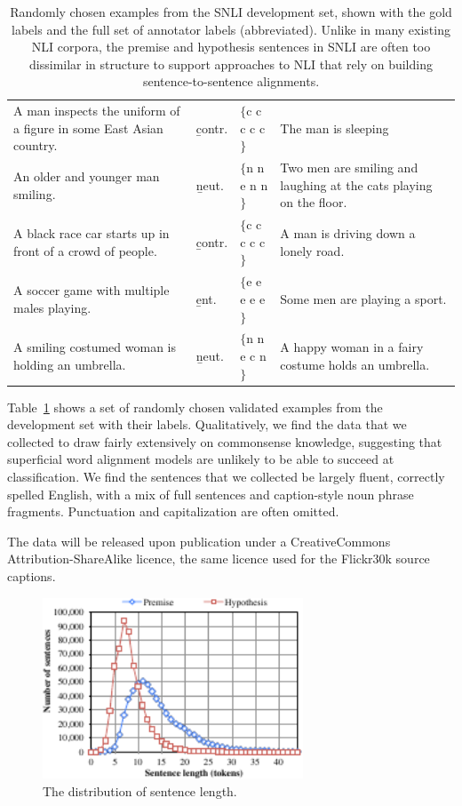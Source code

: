 \begin{table}
  \centering\footnotesize
  \begin{tabular}{p{6cm}p{0.75cm}p{1.4cm}p{6cm}}
  \toprule
A man inspects the uniform of a figure in some East Asian country. & \b{contr.}& \t{$\{$c c c c c$\}$} & The man is sleeping\\
\rule{0pt}{3ex}An older and younger man smiling. & \b{neut.}& \t{$\{$n n e n n$\}$} & Two men are smiling and laughing at the cats playing on the floor.\\
\rule{0pt}{3ex}A black race car starts up in front of a crowd of people. & \b{contr.}& \t{$\{$c c c c c$\}$} & A man is driving down a lonely road.\\
\rule{0pt}{3ex}A soccer game with multiple males playing. & \b{ent.}& \t{$\{$e e e e e$\}$} & Some men are playing a sport.\\
\rule{0pt}{3ex}A smiling costumed woman is holding an umbrella. & \b{neut.}& \t{$\{$n n e c n$\}$} & A happy woman in a fairy costume holds an umbrella.\\
    \bottomrule
  \end{tabular}
  \caption{\label{snli-examples}Randomly chosen examples from the SNLI development set, shown with the gold labels and the full set of annotator labels (abbreviated). Unlike in many existing NLI corpora, the premise and hypothesis sentences in SNLI are often too dissimilar in structure to support approaches to NLI that rely on building sentence-to-sentence alignments.}
\end{table}

Table~\ref{snli-examples} shows a set of randomly chosen validated examples from the development set with their labels. Qualitatively, we find the data that we collected to draw fairly extensively on commonsense knowledge, suggesting that superficial word alignment models are unlikely to be able to succeed at classification. We find the sentences that we collected be largely fluent, correctly spelled English, with a mix of full sentences and caption-style noun phrase fragments. Punctuation and capitalization are often omitted.

The data will be released upon publication under a CreativeCommons
Attribution-ShareAlike licence, the same licence used for the Flickr30k source captions.

\begin{figure}
\center
\includegraphics[width=3.05in]{length_dist}
\caption{\label{b-table}The distribution of sentence length.} 
\end{figure}

